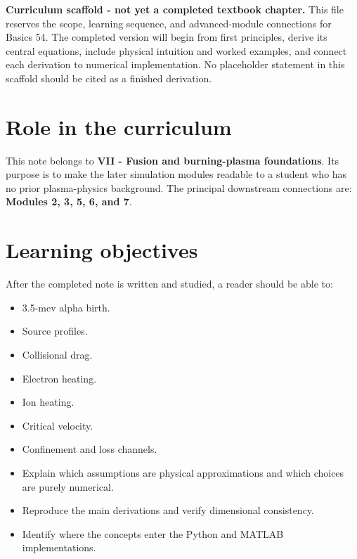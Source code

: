 \documentclass[11pt]{article}
\begin{document}

\begin{overviewbox}
\textbf{Curriculum scaffold - not yet a completed textbook chapter.} This file reserves the scope, learning sequence, and advanced-module connections for Basics 54. The completed version will begin from first principles, derive its central equations, include physical intuition and worked examples, and connect each derivation to numerical implementation. No placeholder statement in this scaffold should be cited as a finished derivation.
\end{overviewbox}

\ProjectTOC

\section{Role in the curriculum}
This note belongs to \textbf{VII - Fusion and burning-plasma foundations}. Its purpose is to make the later simulation modules readable to a student who has no prior plasma-physics background. The principal downstream connections are: \textbf{Modules 2, 3, 5, 6, and 7}.

\section{Learning objectives}
After the completed note is written and studied, a reader should be able to:
\begin{itemize}[leftmargin=1.6em]
\item 3.5-mev alpha birth.
\item Source profiles.
\item Collisional drag.
\item Electron heating.
\item Ion heating.
\item Critical velocity.
\item Confinement and loss channels.
\item Explain which assumptions are physical approximations and which choices are purely numerical.
\item Reproduce the main derivations and verify dimensional consistency.
\item Identify where the concepts enter the Python and MATLAB implementations.
\end{itemize}
\end{document}
